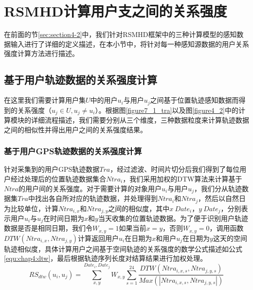 \section{RSMHD计算用户支之间的关系强度}
\label{sec:section4-3}
在前面的节\ref{sec:section4-2}中，我们针对RSMHD框架中的三种计算模型的感知数据输入进行了详细的定义描述，在本小节中，将针对每一种感知源数据的用户关系强度计算方法进行描述。
\subsection{基于用户轨迹数据的关系强度计算}
在这里我们需要计算用户集$U$中的用户$u_{i}$与用户$u_{j}$之间基于位置轨迹感知数据而得到的关系强度（$u_{j} \in U,u_{j} \neq u_{i}$）。根据图\ref{figure7_1_tra}以及图\ref{figure4_2}中的计算模块的详细流程描述，我们需要分别从三个维度，三种数据粒度来计算轨迹数据之间的相似性并得出用户之间的关系强度结果。
\subsubsection{基于用户GPS轨迹数据的关系强度计算}
针对采集到的用户GPS轨迹数据$Tra$，经过滤波、时间片切分后我们得到了每位用户经过处理后的位置轨迹数据集合$Ntra_{i}$，我们采用加权的DTW算法来计算基于$Ntra$的用户间的关系强度。对于需要计算的对象用户$u_{i}$与用户$u_{j}$，我们分从轨迹数据集$Tra$中找出各自所对应的轨迹数据，并处理得到$Ntra_{i}$和$Ntra_{j}$，然后以自然日为比较单位，计算$Ntra_{i,x}$和$Ntra_{j,y}$之间的相似度，其中$x \ Date_{i}$，$y \ Date_{j}$，分别表示用户$u_{i}$与$u_{j}$在时间日期为$x$和$y$当天收集的位置轨迹数据。为了便于识别用户轨迹数据是否是相同日期，我们令$W_{x,y}=1$如果当前$x=y$，否则$W_{x,y}=0$，调用函数$DTW(Ntra_{i,x},Ntra_{j,y})$计算返回用户$u_{i}$在日期为$x$和用户$u_{j}$在日期为$y$这天的空间轨迹相似度，具体计算用户之间基于空间轨迹的关系强度的数学公式描述如公式\ref{equ:chap4:dtw}，最后根据轨迹序列长度对结算结果进行加权处理。
\begin{equation}
\label{equ:chap4:dtw}
RS_{dtw}(u_{i},u_{j})=\sum_{x ,y }^{ Date_{i}, Date_{j}}W_{x,y}\sum_{s=1}^{24} \frac{DTW(Ntra_{i,x,s},Ntra_{j,y,s})}{Max(\left | Ntra_{i,x,s},Ntra_{j,y,s}  \right |)}
\end{equation}
